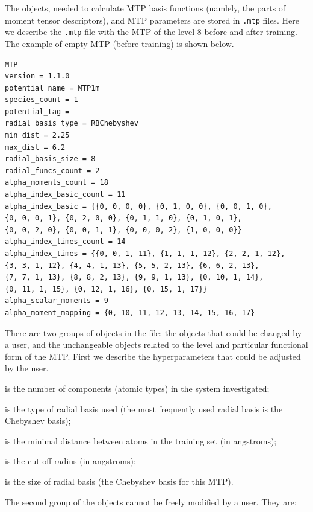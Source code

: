 \documentclass[12pt]{article}
\renewcommand{\_}{\char`_}
\begin{document}
The objects, needed to calculate MTP basis functions (namlely, the parts of moment tensor descriptors), and MTP parameters are stored in \verb|.mtp| files. Here we describe the \verb|.mtp| file with the MTP of the level 8 before and after training. The example of empty MTP (before training) is shown below.
\begin{verbatim}
MTP
version = 1.1.0
potential_name = MTP1m
species_count = 1
potential_tag = 
radial_basis_type = RBChebyshev
min_dist = 2.25
max_dist = 6.2
radial_basis_size = 8
radial_funcs_count = 2
alpha_moments_count = 18
alpha_index_basic_count = 11
alpha_index_basic = {{0, 0, 0, 0}, {0, 1, 0, 0}, {0, 0, 1, 0},
{0, 0, 0, 1}, {0, 2, 0, 0}, {0, 1, 1, 0}, {0, 1, 0, 1},
{0, 0, 2, 0}, {0, 0, 1, 1}, {0, 0, 0, 2}, {1, 0, 0, 0}}
alpha_index_times_count = 14
alpha_index_times = {{0, 0, 1, 11}, {1, 1, 1, 12}, {2, 2, 1, 12},
{3, 3, 1, 12}, {4, 4, 1, 13}, {5, 5, 2, 13}, {6, 6, 2, 13},
{7, 7, 1, 13}, {8, 8, 2, 13}, {9, 9, 1, 13}, {0, 10, 1, 14},
{0, 11, 1, 15}, {0, 12, 1, 16}, {0, 15, 1, 17}}
alpha_scalar_moments = 9
alpha_moment_mapping = {0, 10, 11, 12, 13, 14, 15, 16, 17}
\end{verbatim}
There are two groups of objects in the file: the objects that could be changed by a user, and the unchangeable objects related to the level and particular functional form of the MTP.
First we describe the hyperparameters that could be adjusted by the user.
\begin{description}[style=nextline,leftmargin=\widthof{\ttfamily radial\_basis\_sizeX|},font=\normalfont\ttfamily]
	\item[species\_count] is the number of components (atomic types) in the system investigated;
	\item[radial\_basis\_type] is the type of radial basis used (the most frequently used radial basis is the Chebyshev basis);
	\item[min\_dist] is the minimal distance between atoms in the training set (in angstroms);
	\item[max\_dist] is the cut-off radius (in angstroms);
	\item[radial\_basis\_size] is the size of radial basis (the Chebyshev basis for this MTP).
\end{description}
The second group of the objects cannot be freely modified by a user. They are:
\end{document}
